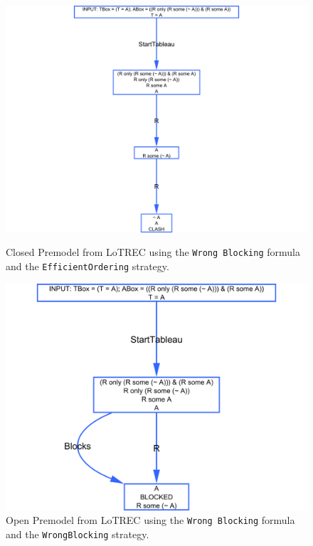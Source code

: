 \documentclass[11pt]{article} %
\begin{document}
 \begin{figure}[htbp]
 \begin{minipage}[b]{0.45\linewidth}
 \centering
 \includegraphics[scale=0.2]{premodelRightBlocking.png}
 \caption{Closed Premodel from LoTREC using the \texttt{Wrong Blocking} formula and the \texttt{EfficientOrdering} strategy.}
 \label{fig:rightBlock}
 \end{minipage}
 \hspace{0.5cm}
 \begin{minipage}[b]{0.45\linewidth}
 \centering
 \includegraphics[scale=0.2]{premodelWrongBlocking.png}
 \caption{Open Premodel from LoTREC using the \texttt{Wrong Blocking} formula and the \texttt{WrongBlocking} strategy.}
 \label{fig:wrongBlock}
 \end{minipage}
 \end{figure}
\end{document}
